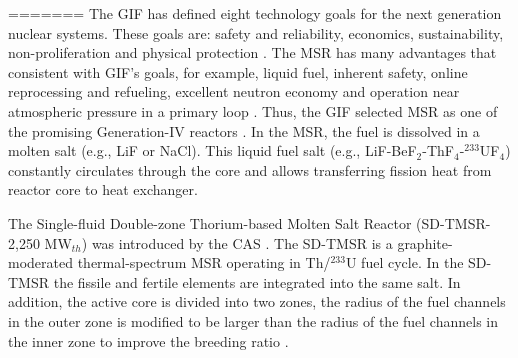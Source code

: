 
=======
The \gls{GIF} has defined eight technology goals for the next generation
nuclear systems. These goals are: safety and reliability, economics,
sustainability, non-proliferation and physical protection
\cite{doe2002technology}. The \gls{MSR} has many advantages that consistent
with \gls{GIF}'s goals, for example, liquid fuel, inherent safety, online
reprocessing and refueling, excellent neutron economy and operation near
atmospheric
pressure in a primary loop \cite{siemer2015molten,rosenthal1970molten}.
Thus, the \gls{GIF} selected \gls{MSR} as one of the promising Generation-IV
reactors \cite{doe2002technology,pioro2016handbook}.
In the \gls{MSR}, the fuel is dissolved in a molten salt (e.g., LiF or NaCl).
This liquid fuel salt (e.g., LiF-BeF$_2$-ThF$_4$-$^{233}$UF$_4$) constantly
circulates through the core and allows transferring fission heat from reactor
core to heat exchanger.

The Single-fluid Double-zone Thorium-based Molten Salt Reactor (SD-TMSR-2,250
MW$_{th}$) was introduced by the \gls{CAS} \cite{li_optimization_2018}. The
SD-TMSR
is a graphite-moderated thermal-spectrum \gls{MSR} operating in Th/$^{233}$U
fuel cycle. In the SD-TMSR the fissile and fertile elements are integrated
into the same salt. In addition, the active core is divided into two zones,
the radius of the fuel channels in the outer zone is modified to be larger
than the radius of the fuel channels in the inner zone to improve the breeding
ratio \cite{nuttin2005potential,li_optimization_2018}.

